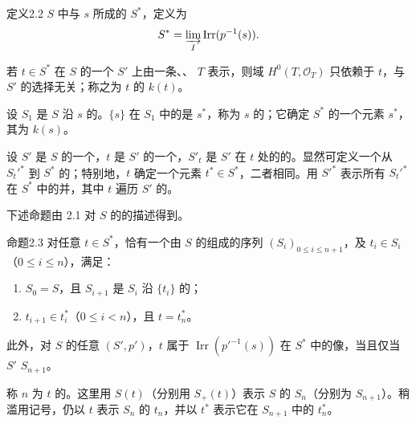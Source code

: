 \begin{SGAresult}{定义}{2.2}
$S$ 中与 $s$ 所成的 $S^*$，定义为
\[
S^*=\varinjlim_I\operatorname{Irr}(p^{-1}(s)).
\]
\end{SGAresult}
若 $t\in S^*$ 在 $S$ 的一个 $S'$ 上由一条、、 $T$ 表示，则域 $H^0(T,\mathcal O_T)$ 只依赖于 $t$，与 $S'$ 的选择无关；称之为 $t$ 的 $k(t)$。

设 $S_1$ 是 $S$ 沿 $s$ 的。$\{s\}$ 在 $S_1$ 中的是 $s^*$，称为 $s$ 的；它确定 $S^*$ 的一个元素 $s^*$，其为 $k(s)$。

设 $S'$ 是 $S$ 的一个，$t$ 是 $S'$ 的一个，$S'_t$ 是 $S'$ 在 $t$ 处的的。显然可定义一个从 $S_t'^*$ 到 $S^*$ 的；特别地，$t$ 确定一个元素 $t^*\in S^*$，二者相同。用 $S'^*$ 表示所有 $S_t'^*$ 在 $S^*$ 中的并，其中 $t$ 遍历 $S'$ 的。

下述命题由 2.1 对 $S$ 的的描述得到。
\begin{SGAresult}{命题}{2.3}
对任意 $t\in S^*$，恰有一个由 $S$ 的组成的序列 $(S_i)_{0\leq i\leq n+1}$，及 $t_i\in S_i$（$0\leq i\leq n$），满足：
\begin{enumerate}
\item[(i)] $S_0=S$，且 $S_{i+1}$ 是 $S_i$ 沿 $\{t_i\}$ 的；
\item[(ii)] $t_{i+1}\in t_i^*$（$0\leq i<n$），且 $t=t_n^*$。
\end{enumerate}
此外，对 $S$ 的任意 $(S',p')$，$t$ 属于 $\operatorname{Irr}(p'^{-1}(s))$ 在 $S^*$ 中的像，当且仅当 $S'$  $S_{n+1}$。
\end{SGAresult}
称 $n$ 为 $t$ 的。这里用 $S(t)$（分别用 $S_+(t)$）表示 $S$ 的 $S_n$（分别为 $S_{n+1}$）。稍滥用记号，仍以 $t$ 表示 $S_n$ 的 $t_n$，并以 $t^*$ 表示它在 $S_{n+1}$ 中的 $t_n^*$。


